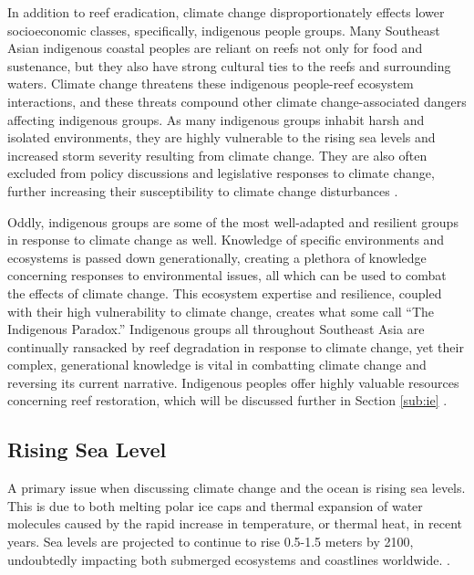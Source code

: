 \documentclass{book}\usepackage{knitr}
\begin{document}
\begin{knitrout}
\begin{kframe}
In addition to reef eradication, climate change disproportionately effects lower socioeconomic classes, specifically, indigenous people groups. Many Southeast Asian indigenous coastal peoples are reliant on reefs not only for food and sustenance, but they also have strong cultural ties to the reefs and surrounding waters. Climate change threatens these indigenous people-reef ecosystem interactions, and these threats compound other climate change-associated dangers affecting indigenous groups. As many indigenous groups inhabit harsh and isolated environments, they are highly vulnerable to the rising sea levels and increased storm severity resulting from climate change. They are also often excluded from policy discussions and legislative responses to climate change, further increasing their susceptibility to climate change disturbances \citep{13772149520190801}.

	Oddly, indigenous groups are some of the most well-adapted and resilient groups in response to climate change as well. Knowledge of specific environments and ecosystems is passed down generationally, creating a plethora of knowledge concerning responses to environmental issues, all which can be used to combat the effects of climate change. This ecosystem expertise and resilience, coupled with their high vulnerability to climate change, creates what some call ``The Indigenous Paradox.'' Indigenous groups all throughout Southeast Asia are continually ransacked by reef degradation in response to climate change, yet their complex, generational knowledge is vital in combatting climate change and reversing its current narrative. Indigenous peoples offer highly valuable resources concerning reef restoration, which will be discussed further in Section \ref{sub:ie} \citep{13772149520190801}.

\subsection{Rising Sea Level}

A primary issue when discussing climate change and the ocean is rising sea levels. This is due to both melting polar ice caps and thermal expansion of water molecules caused by the rapid increase in temperature, or thermal heat, in recent years. Sea levels are projected to continue to rise 0.5-1.5 meters by 2100, undoubtedly impacting both submerged ecosystems and coastlines worldwide. \citep{coralreefalliance_2021}.


\end{kframe}
\end{knitrout}
\end{document}
